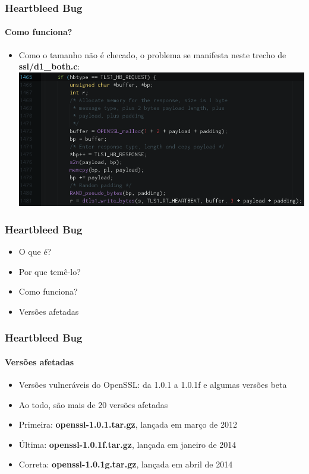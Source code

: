 \documentclass{beamer}
\begin{document}
\begin{frame}
	\frametitle{Heartbleed Bug}
	\framesubtitle{Como funciona?}
	\begin{itemize}
		\item Como o tamanho não é checado, o problema se manifesta neste trecho de \textbf{ssl/d1\_both.c}:\\
		\includegraphics[scale=0.41]{04_HB2.png}\\
	\end{itemize}
\end{frame}

\begin{frame}
	\frametitle{Heartbleed Bug}
	\begin{itemize}
		\item \textcolor{covered}{O que é?}
		\item \textcolor{covered}{Por que temê-lo?}
		\item \textcolor{covered}{Como funciona?}
		\item Versões afetadas
	\end{itemize}
\end{frame}

\begin{frame}
	\frametitle{Heartbleed Bug}
	\framesubtitle{Versões afetadas}
	\begin{itemize}
		\item Versões vulneráveis do OpenSSL: da 1.0.1 a 1.0.1f e algumas versões beta
		\item Ao todo, são mais de 20 versões afetadas
		\item Primeira: \textbf{\textcolor{filecolor}{openssl-1.0.1.tar.gz}}, lançada em março de 2012
		\item Última: \textbf{\textcolor{filecolor}{openssl-1.0.1f.tar.gz}}, lançada em janeiro de 2014
		\item Correta: \textbf{\textcolor{filecolor}{openssl-1.0.1g.tar.gz}}, lançada em abril de 2014
	\end{itemize}
\end{frame}
\end{document}
